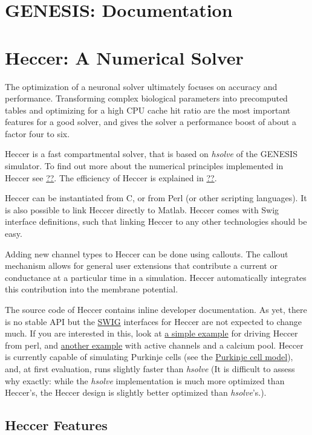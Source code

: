 \documentclass[12pt]{article}
\begin{document}
\section*{GENESIS: Documentation}

\section*{Heccer: A Numerical Solver}

The optimization of a neuronal solver ultimately focuses on accuracy and performance. Transforming complex biological parameters into precomputed tables and optimizing for a high CPU cache hit ratio are the most important features for a good solver, and gives the solver a performance boost of about a factor four to six.

Heccer is a fast compartmental solver, that is based on {\it hsolve} of the GENESIS simulator. To find out more about the numerical principles implemented in Heccer see \href{}{??}. The efficiency of Heccer is explained in \href{}{??}.

Heccer can be instantiated from C, or from Perl (or other scripting languages). It is also possible to link Heccer directly to Matlab. Heccer comes with Swig interface definitions, such that linking Heccer to any other technologies should be easy.

Adding new channel types to Heccer can be done using callouts. The callout mechanism allows for general user extensions that contribute a current or conductance at a particular time in a simulation. Heccer automatically integrates this contribution into the membrane potential.

The source code of Heccer contains inline developer documentation. As yet, there is no stable API but the \href{http://www.swig.org/}{SWIG} interfaces for Heccer are not expected to change much. If you are interested in this, look at \href{}{a simple example} for driving Heccer from perl, and \href{}{another example} with active channels and a calcium pool. Heccer is currently capable of simulating Purkinje cells (see the \href{../purkinje-cell-model/purkinje-cell-model.tex}{Purkinje cell model}), and, at first evaluation, runs slightly faster than {\it hsolve} (It is difficult to assess why exactly: while the {\it hsolve} implementation is much more optimized than Heccer's, the Heccer design is slightly better optimized than {\it hsolve}'s.).

\subsection*{Heccer Features}
\end{document}
